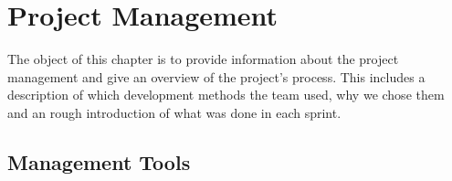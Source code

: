 \chapter{Project Management}
The object of this chapter is to provide information about the project management and give an overview of the project's process. This includes a description of which development methods the team used, why we chose them and an rough introduction of what was done in each sprint.
\newpage
\section{Management Tools}



\newpage

\newpage
